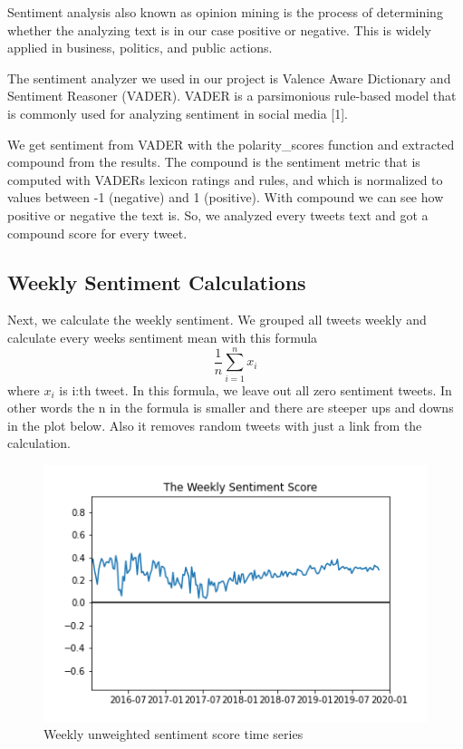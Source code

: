 \documentclass{article}
\begin{document}
Sentiment analysis also known as opinion mining is the process of determining whether the analyzing text is in our case positive or negative. This is widely applied in business, politics, and public actions.

The sentiment analyzer we used in our project is Valence Aware Dictionary and Sentiment Reasoner (VADER). VADER is a parsimonious rule-based model that is commonly used for analyzing sentiment in social media [1].

We get sentiment from VADER with the polarity\_scores function and extracted compound from the results. The compound is the sentiment metric that is computed with VADERs lexicon ratings and rules, and which is normalized to values between -1 (negative) and 1 (positive). With compound we can see how positive or negative the text is. So, we analyzed every tweets text and got a compound score for every tweet. 

\subsection{Weekly Sentiment Calculations}

Next, we calculate the weekly sentiment. We grouped all tweets weekly and calculate every weeks sentiment mean with this formula  \[\frac{1}{n}\sum_{i=1}^{n}x_i\] where $x_i$ is i:th tweet. In this formula, we leave out all zero sentiment tweets. In other words the n in the formula is smaller and there are steeper ups and downs in the plot below. Also it removes random tweets with just a link from the calculation. 

\begin{figure}[h]
    \centering
    \includegraphics[scale=0.75]{WeeklySentiment.png}
    \caption{Weekly unweighted sentiment score time series}
    \label{fig:my_label}
\end{figure}
\end{document}
